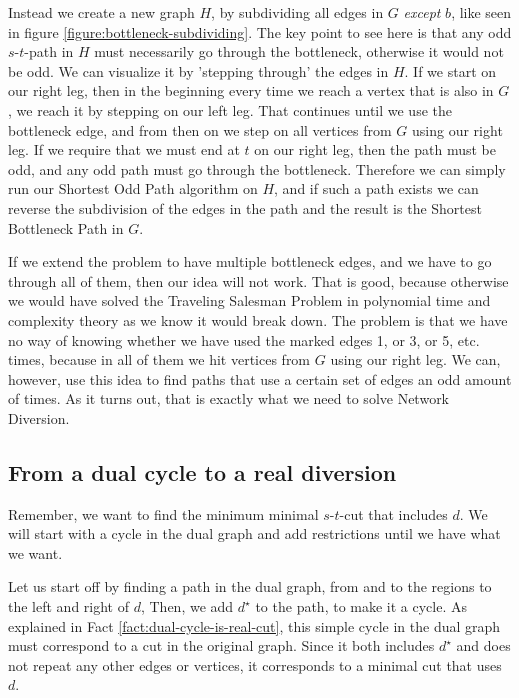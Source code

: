 Instead we create a new graph $H$, by subdividing all edges in $G$ \emph{except} $b$, like seen in figure \ref{figure:bottleneck-subdividing}. The key point to see here is that any odd $s$-$t$-path in $H$ must necessarily go through the bottleneck, otherwise it would not be odd. We can visualize it by 'stepping through' the edges in $H$. If we start on our right leg, then in the beginning every time we reach a vertex that is also in $G$, we reach it by stepping on our left leg. That continues until we use the bottleneck edge, and from then on we step on all vertices from $G$ using our right leg. If we require that we must end at $t$ on our right leg, then the path must be odd, and any odd path must go through the bottleneck. Therefore we can simply run our Shortest Odd Path algorithm on $H$, and if such a path exists we can reverse the subdivision of the edges in the path and the result is the Shortest Bottleneck Path in $G$.

If we extend the problem to have multiple bottleneck edges, and we have to go through all of them, then our idea will not work. That is good, because otherwise we would have solved the Traveling Salesman Problem in polynomial time and complexity theory as we know it would break down.
The problem is that we have no way of knowing whether we have used the marked edges 1, or 3, or 5, etc. times, because in all of them we hit vertices from $G$ using our right leg. We can, however, use this idea to find paths that use a certain set of edges an odd amount of times. As it turns out, that is exactly what we need to solve Network Diversion.


\subsection{From a dual cycle to a real diversion}
Remember, we want to find the minimum minimal $s$-$t$-cut that includes $d$.  We will start with a cycle in the dual graph and add restrictions until we have what we want.

Let us start off by finding a path in the dual graph, from and to the regions to the left and right of $d$, Then, we add $d^\star$ to the path, to make it a cycle. As explained in Fact \ref{fact:dual-cycle-is-real-cut}, this simple cycle in the dual graph must correspond to a cut in the original graph. Since it both includes $d^\star$ and does not repeat any other edges or vertices, it corresponds to a minimal cut that uses $d$.

